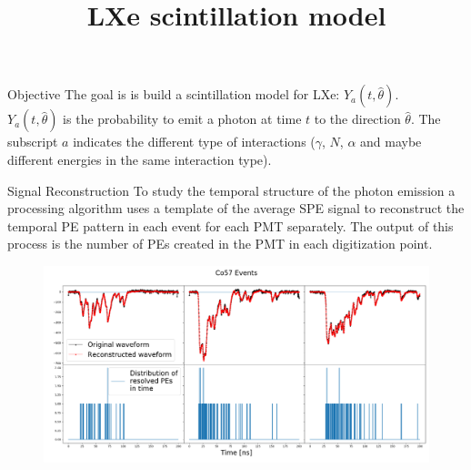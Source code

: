 \documentclass{beamer}
\title{LXe scintillation model}
\begin{document}
{ 
\frame{\titlepage}}

\begin{frame}{Objective}
The goal is is build a scintillation model for LXe: $Y_{a}(t,\hat{\theta})$.\\
$Y_{a}(t,\hat{\theta})$ is the probability to emit a photon at time $t$ to the direction $\hat{\theta}$. The subscript $a$ indicates the different type of interactions ($\gamma$, $N$, $\alpha$ and maybe different energies in the same interaction type).\\
\end{frame}


\begin{frame}{Signal Reconstruction}
To study the temporal structure of the photon emission a processing algorithm uses a template of the average SPE signal to reconstruct the temporal PE pattern in each event for each PMT separately. The output of this process is the number of PEs created in the PMT in each digitization point.

\begin{figure}[h]
\includegraphics[width=1\textwidth]{recons.png}
\end{figure}

\end{frame}
\end{document}
